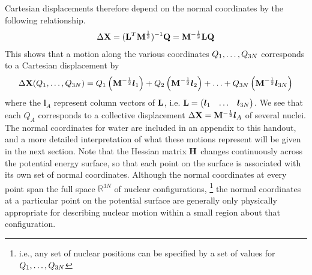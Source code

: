 \documentclass[11pt]{article}
\begin{document}
Cartesian displacements therefore depend on the normal coordinates by the
following relationship.
\begin{align*}
    \Delta\mathbf{X}
=
    (\mathbf{L}^T\mathbf{M}^{\frac{1}{2}})^{-1}\mathbf{Q}
=
    \mathbf{M}^{-\frac{1}{2}}\mathbf{L}\mathbf{Q}
\end{align*}
This shows that a motion along the various coordinates $Q_1,\ldots,Q_{3N}$
corresponds to a Cartesian displacement by
\begin{align}
    \Delta\mathbf{X}(Q_1,\ldots,Q_{3N})
=
    Q_1\left(\mathbf{M}^{-\frac{1}{2}}\bm{l}_1\right)
+
    Q_2\left(\mathbf{M}^{-\frac{1}{2}}\bm{l}_2\right)
+
    \ldots
+
    Q_{3N}\left(\mathbf{M}^{-\frac{1}{2}}\bm{l}_{3N}\right)
\end{align}
where the $\bm{l}_A$ represent column vectors of $\mathbf{L}$, i.e.
$\mathbf{L}=\left(\begin{matrix}\bm{l}_1&\ldots&\bm{l}_{3N}\end{matrix}\right)$. We see that each $Q_A$ corresponds to a
collective displacement $\Delta\mathbf{X}=\mathbf{M}^{-\frac{1}{2}}\bm{l}_A$ of several
nuclei. The normal coordinates for water are included in an appendix to this
handout, and a more detailed interpretation of what these motions represent
will be given in the next section. Note that the Hessian matrix $\mathbf{H}$
changes continuously across the potential energy surface, so that each point on
the surface is associated with its own set of normal coordinates. Although the
normal coordinates at every point span the full space $\mathbb{R}^{3N}$ of
nuclear configurations, \footnote{i.e., any set of nuclear positions can be
specified by a set of values for $Q_1,\ldots,Q_{3N}$} the normal coordinates at a
particular point on the potential surface are generally only physically
appropriate for describing nuclear motion within a small region about that
configuration.
\end{document}
